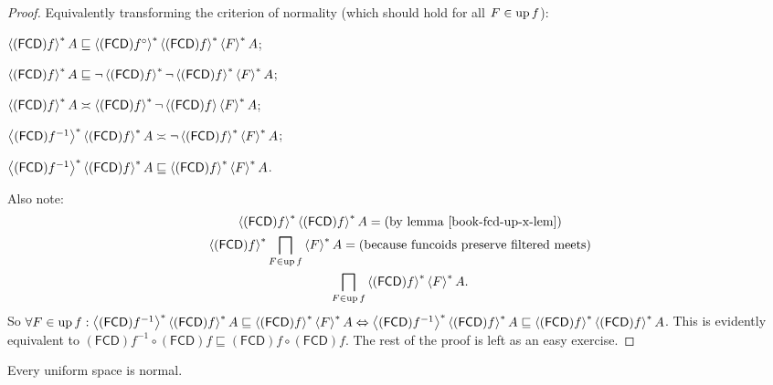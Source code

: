 \begin{proof}
  Equivalently transforming the criterion of normality (which should hold for
  all $F \in \operatorname{up} f$):
  
  $\left\langle (\mathsf{FCD}) f\right\rangle ^{\ast} A \sqsubseteq
  \left\langle (\mathsf{FCD}) f^{\circ}\right\rangle ^{\ast}
  \left\langle (\mathsf{FCD}) f\right\rangle ^{\ast} \left\langle F\right\rangle ^{\ast} A$;
  
  $\left\langle (\mathsf{FCD}) f\right\rangle ^{\ast} A \sqsubseteq \neg
  \left\langle (\mathsf{FCD}) f\right\rangle ^{\ast} \neg \left\langle  (\mathsf{FCD}) f \right\rangle ^{\ast}
  \left\langle F\right\rangle ^{\ast} A$;
  
  $\left\langle (\mathsf{FCD}) f\right\rangle ^{\ast} A \asymp
  \left\langle (\mathsf{FCD}) f\right\rangle ^{\ast} \neg \left\langle (\mathsf{FCD}) f\right\rangle \left\langle F\right\rangle ^{\ast} A$;
  
  $\left\langle (\mathsf{FCD}) f^{- 1}\right\rangle ^{\ast}
  \left\langle (\mathsf{FCD}) f\right\rangle ^{\ast} A \asymp \neg
  \left\langle (\mathsf{FCD}) f\right\rangle ^{\ast} \left\langle F\right\rangle ^{\ast} A$;
  
  $\left\langle (\mathsf{FCD}) f^{- 1}\right\rangle ^{\ast}
  \left\langle (\mathsf{FCD}) f\right\rangle ^{\ast} A \sqsubseteq
  \left\langle (\mathsf{FCD}) f\right\rangle ^{\ast} \left\langle F\right\rangle ^{\ast} A$.
  
  Also note:
  \begin{multline*}
     \rsupfun{(\mathsf{FCD}) f} \rsupfun{(\mathsf{FCD}) f} A = \text{(by lemma~\bookref{fcd-up-x-lem})} \\
     \rsupfun{(\mathsf{FCD}) f} \bigsqcap_{F \in \up f} \rsupfun{F} A = \text{(because funcoids preserve filtered meets)} \\
     \bigsqcap_{F \in \up f} \rsupfun{(\mathsf{FCD}) f} \rsupfun{F}
     A.
  \end{multline*}
  So $\forall F \in \operatorname{up} f : \left\langle  (\mathsf{FCD}) f^{- 1}
  \right\rangle ^{\ast} \left\langle (\mathsf{FCD}) f\right\rangle ^{\ast} A \sqsubseteq
  \left\langle (\mathsf{FCD}) f\right\rangle ^{\ast} \left\langle F\right\rangle ^{\ast} A
  \Leftrightarrow \left\langle (\mathsf{FCD}) f^{- 1}\right\rangle ^{\ast}
  \left\langle (\mathsf{FCD}) f\right\rangle ^{\ast} A \sqsubseteq
  \left\langle (\mathsf{FCD}) f\right\rangle ^{\ast} \left\langle (\mathsf{FCD}) f\right\rangle ^{\ast} A$. This is
  evidently equivalent to $(\mathsf{FCD}) f^{- 1} \circ
  (\mathsf{FCD}) f \sqsubseteq (\mathsf{FCD}) f \circ
  (\mathsf{FCD}) f$. The rest of the proof is left as an easy exercise.
\end{proof}

\begin{cor}
  Every uniform space is normal.
\end{cor}